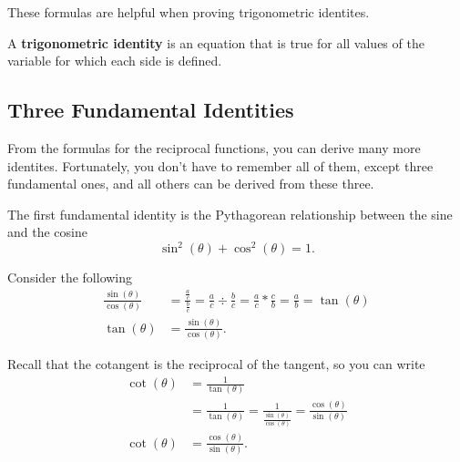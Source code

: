 These formulas are helpful when proving trigonometric identites.

\begin{definition}
	\label{def:trigonometric_identites}

	A \textbf{trigonometric identity} is an equation that is true for all values
	of the variable for which each side is defined.
\end{definition}


\subsection{Three Fundamental Identities}
\label{sub_sec:three_fundamental_identities}

From the formulas for the reciprocal functions, you can derive many more
identites. Fortunately, you don't have to remember all of them, except three
fundamental ones, and all others can be derived from these three.

\begin{identity}[Pythagorean]
	\label{idn:pythagorean}

	The first fundamental identity is the Pythagorean relationship between the sine
	and the cosine
	\[%
		\sin^{2}(\theta) + \cos^{2}(\theta) = 1
  .\]%
\end{identity}

\begin{identity}[Tangent]
	\label{idn:tangent}

	Consider the following
	\begin{align*}
		\frac{\sin(\theta)}{\cos(\theta)} & = \frac{\frac{a}{c}}{\frac{b}{c}} = \frac{a}{c} \div \frac{b}{c} = \frac{a}{c} * \frac{c}{b} = \frac{a}{b} = \tan(\theta) \\
		\tan(\theta)                      & = \frac{\sin(\theta)}{\cos(\theta)}
		.\end{align*}
\end{identity}

\begin{identity}[Cotangent]
	\label{idn:cotangent}

	Recall that the cotangent is the reciprocal of the tangent, so you can write
	\begin{align*}
		\cot(\theta) & = \frac{1}{\tan(\theta)}                                                                                   \\
		             & = \frac{1}{\tan(\theta)} = \frac{1}{\frac{\sin(\theta)}{\cos(\theta)}} = \frac{\cos(\theta)}{\sin(\theta)} \\
		\cot(\theta) & = \frac{\cos(\theta)}{\sin(\theta)}
		.\end{align*}
\end{identity}

